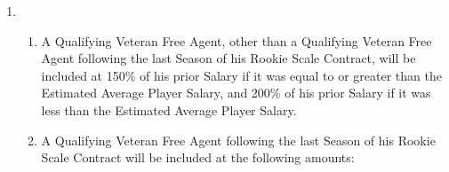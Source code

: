 \documentclass[
]{book}
\providecommand{\tightlist}{%
  \setlength{\itemsep}{0pt}\setlength{\parskip}{0pt}}
\begin{document}
\begin{enumerate}
  \begin{enumerate}
  \def\labelenumii{(\arabic{enumii})}
  \item
    \begin{enumerate}
    \def\labelenumiii{(\roman{enumiii})}
    \tightlist
    \item
      A Qualifying Veteran Free Agent, other than a Qualifying Veteran Free Agent following the last Season of his Rookie Scale Contract, will be included at 150\% of his prior Salary if it was equal to or greater than the Estimated Average Player Salary, and 200\% of his prior Salary if it was less than the Estimated Average Player Salary.
    \item
      A Qualifying Veteran Free Agent following the last Season of his Rookie Scale Contract will be included at the following amounts:


\end{enumerate}
\end{enumerate}
\end{enumerate}
\end{document}
